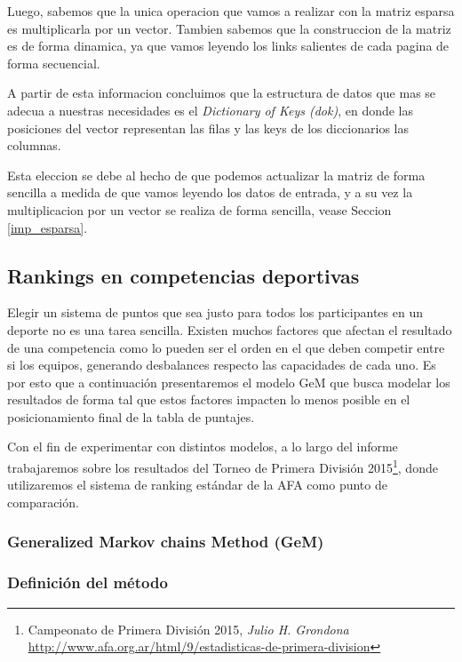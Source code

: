 Luego, sabemos que la unica operacion que vamos a realizar con la matriz esparsa es multiplicarla por un vector. Tambien sabemos que la
construccion de la matriz es de forma dinamica, ya que vamos leyendo los links salientes de cada pagina de forma secuencial.

A partir de esta informacion concluimos que la estructura de datos que mas se adecua a nuestras necesidades es el \textit{Dictionary
of Keys (dok)}, en donde las posiciones del vector representan las filas y las keys de los diccionarios las columnas.

Esta eleccion se debe al hecho de que podemos actualizar la matriz de forma sencilla a medida de que vamos leyendo los datos de entrada, y a su vez
 la multiplicacion por un vector se realiza de forma sencilla, vease Seccion \ref{imp_esparsa}.


\subsection{Rankings en competencias deportivas}

Elegir un sistema de puntos que sea justo para todos los participantes en un
deporte no es una tarea sencilla. Existen muchos factores que afectan el
resultado de una competencia como lo pueden ser el orden en el que deben
competir entre si los equipos, generando desbalances respecto las capacidades de
cada uno. Es por esto que a continuación presentaremos el modelo GeM\cite{Govan2008}
 que busca modelar los resultados de forma tal que estos
factores impacten lo menos posible en el posicionamiento final de la tabla de
puntajes.

Con el fin de experimentar con distintos modelos, a lo largo del informe
trabajaremos sobre los resultados del Torneo de Primera División
2015\footnote{Campeonato de Primera División 2015, \textit{Julio H. Grondona} \\
\url{http://www.afa.org.ar/html/9/estadisticas-de-primera-division}}, donde
utilizaremos el sistema de ranking estándar de la AFA como punto de comparación.

\subsubsection{Generalized Markov chains Method (GeM)}
\label{sec:gem_model}

\subsubsection*{Definición del método}

